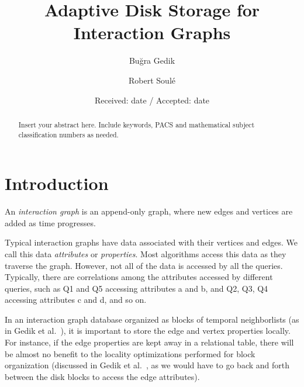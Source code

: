 \documentclass[twocolumn]{svjour3}          %
\begin{document}
\title{Adaptive Disk Storage for Interaction Graphs}


\author{Bu\u{g}ra Gedik         \and
        Robert Soul\'{e}%
}



\date{Received: date / Accepted: date}


\maketitle

\begin{abstract}
Insert your abstract here. Include keywords, PACS and mathematical
subject classification numbers as needed.
\end{abstract}



\section{Introduction}
An \emph{interaction graph} is an append-only graph, where new edges and
vertices are added as time progresses.%

Typical interaction graphs have data associated with their vertices and edges.
We call this data \emph{attributes} or \emph{properties}. Most algorithms
access this data as they traverse the graph. However, not all of the data is
accessed by all the queries. Typically, there are correlations among the
attributes accessed by different queries, such as Q1 and Q5 accessing
attributes a and b, and Q2, Q3, Q4 accessing attributes c and d, and so on.%

In an interaction graph database organized as blocks of temporal neighborlists
(as in Gedik et al.~\cite{gedik14}), it is important to store the edge and
vertex properties locally. For  instance, if the edge properties are kept away
in a relational table, there will be almost no benefit to the locality
optimizations performed for block organization (discussed in Gedik et
al.~\cite{gedik14}, as we would have to go back and forth between the disk
blocks to access the edge attributes).%
\end{document}
